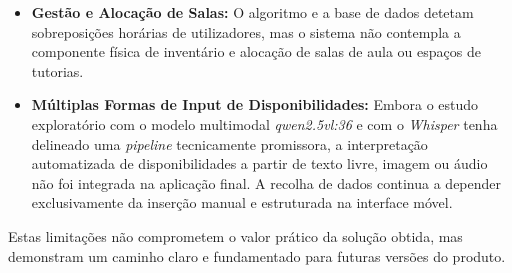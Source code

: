 \begin{itemize}
    \item \textbf{Gestão e Alocação de Salas:} O algoritmo e a base de dados detetam sobreposições horárias de utilizadores, mas o sistema não contempla a componente física de inventário e alocação de salas de aula ou espaços de tutorias.
    \item \textbf{Múltiplas Formas de Input de Disponibilidades:} Embora o estudo exploratório com o modelo multimodal \textit{qwen2.5vl:36} e com o \textit{Whisper} tenha delineado uma \textit{pipeline} tecnicamente promissora, a interpretação automatizada de disponibilidades a partir de texto livre, imagem ou áudio não foi integrada na aplicação final. A recolha de dados continua a depender exclusivamente da inserção manual e estruturada na interface móvel.
\end{itemize}

Estas limitações não comprometem o valor prático da solução obtida, mas demonstram um caminho claro e fundamentado para futuras versões do produto.
